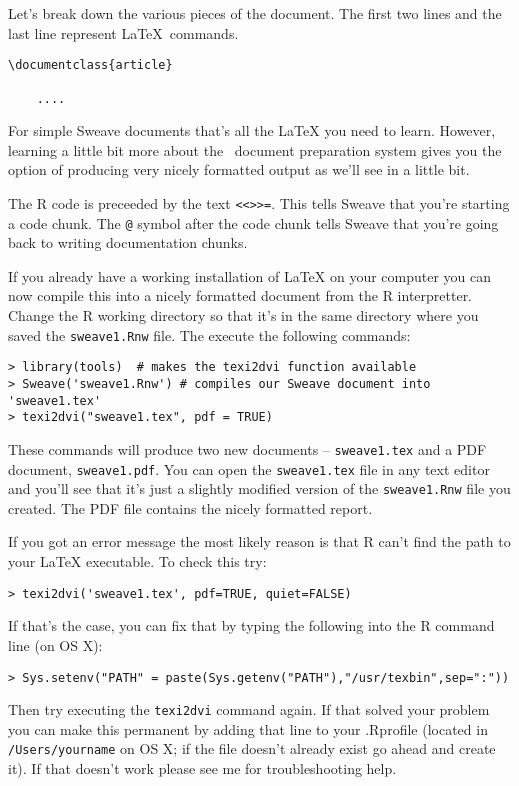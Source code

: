 Let's break down the various pieces of the document. The first two lines
and the last line represent LaTeX~commands.

\begin{lstlisting}
\documentclass{article}

    ....

\end{lstlisting}
For simple Sweave documents that's all the LaTeX you need to learn.
However, learning a little bit more about the ~document preparation
system gives you the option of producing very nicely formatted output as
we'll see in a little bit.

The R code is preceeded by the text \lstinline!<<>>=!. This tells Sweave
that you're starting a code chunk. The \lstinline!@! symbol after the
code chunk tells Sweave that you're going back to writing documentation
chunks.

If you already have a working installation of LaTeX on your computer you
can now compile this into a nicely formatted document from the R
interpretter. Change the R working directory so that it's in the same
directory where you saved the \lstinline!sweave1.Rnw! file. The execute
the following commands:

\begin{lstlisting}
> library(tools)  # makes the texi2dvi function available
> Sweave('sweave1.Rnw') # compiles our Sweave document into 'sweave1.tex'
> texi2dvi("sweave1.tex", pdf = TRUE)
\end{lstlisting}
These commands will produce two new documents -- \lstinline!sweave1.tex!
and a PDF document, \lstinline!sweave1.pdf!. You can open the
\lstinline!sweave1.tex! file in any text editor and you'll see that it's
just a slightly modified version of the \lstinline!sweave1.Rnw! file you
created. The PDF file contains the nicely formatted report.

If you got an error message the most likely reason is that R can't find
the path to your LaTeX executable. To check this try:

\begin{lstlisting}
> texi2dvi('sweave1.tex', pdf=TRUE, quiet=FALSE)
\end{lstlisting}
If that's the case, you can fix that by typing the following into the R
command line (on OS X):

\begin{lstlisting}
> Sys.setenv("PATH" = paste(Sys.getenv("PATH"),"/usr/texbin",sep=":"))  
\end{lstlisting}
Then try executing the \lstinline!texi2dvi! command again. If that
solved your problem you can make this permanent by adding that line to
your .Rprofile (located in \lstinline!/Users/yourname! on OS X; if the
file doesn't already exist go ahead and create it). If that doesn't work
please see me for troubleshooting help.


